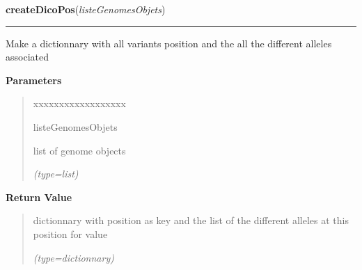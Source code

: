 \hspace{.8\funcindent}\begin{boxedminipage}{\funcwidth}

    \raggedright \textbf{createDicoPos}(\textit{listeGenomesObjets})

    \vspace{-1.5ex}

    \rule{\textwidth}{0.5\fboxrule}
\setlength{\parskip}{2ex}
    Make a dictionnary with all variants position and the all the different
    alleles associated

\setlength{\parskip}{1ex}
      \textbf{Parameters}
      \vspace{-1ex}

      \begin{quote}
        \begin{Ventry}{xxxxxxxxxxxxxxxxxx}

          \item[listeGenomesObjets]

          list of genome objects

            {\it (type=list)}

        \end{Ventry}

      \end{quote}

      \textbf{Return Value}
    \vspace{-1ex}

      \begin{quote}
      dictionnary with position as key and the list of the different 
      alleles at this position for value

      {\it (type=dictionnary)}

      \end{quote}

    \end{boxedminipage}

    \label{script-phyloFixedVar:selectPosSpecifique}

    \vspace{0.5ex}

